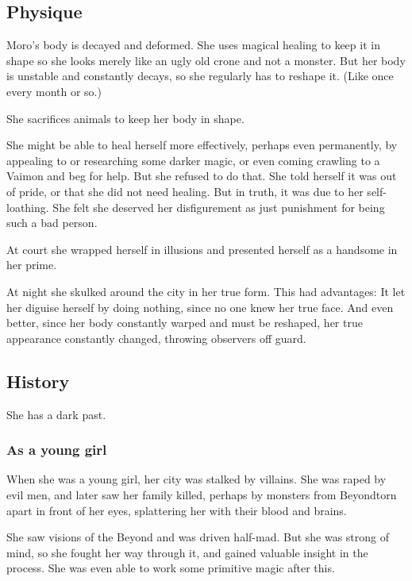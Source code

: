 \subsection{Physique}
Moro's body is decayed and deformed. 
She uses magical healing to keep it in shape so she looks merely like an ugly old crone and not a monster. 
But her body is unstable and constantly decays, so she regularly has to reshape it. 
(Like once every month or so.)

She sacrifices animals to keep her body in shape. 

She might be able to heal herself more effectively, perhaps even permanently, by appealing to  or researching some darker magic, or even coming crawling to a Vaimon and beg for help. 
But she refused to do that. 
She told herself it was out of pride, or that she did not need healing. 
But in truth, it was due to her self-loathing. 
She felt she deserved her disfigurement as just punishment for being such a bad person. 

At court she wrapped herself in illusions and presented herself as a handsome \sphyle{} in her prime. 

At night she skulked around the city in her true form. 
This had advantages: It let her diguise herself by doing nothing, since no one knew her true face. 
And even better, since her body constantly warped and must be reshaped, her true appearance constantly changed, throwing observers off guard. 









\subsection{History}
She has a dark past. 





\subsubsection{As a young girl}
When she was a young girl, her city was stalked by villains. She was raped by evil men, and later saw her family killed, perhaps by monsters from Beyond\dash torn apart in front of her eyes, splattering her with their blood and brains. 

She saw visions of the Beyond and was driven half-mad. 
But she was strong of mind, so she fought her way through it, and gained valuable insight in the process. 
She was even able to work some primitive magic after this.

